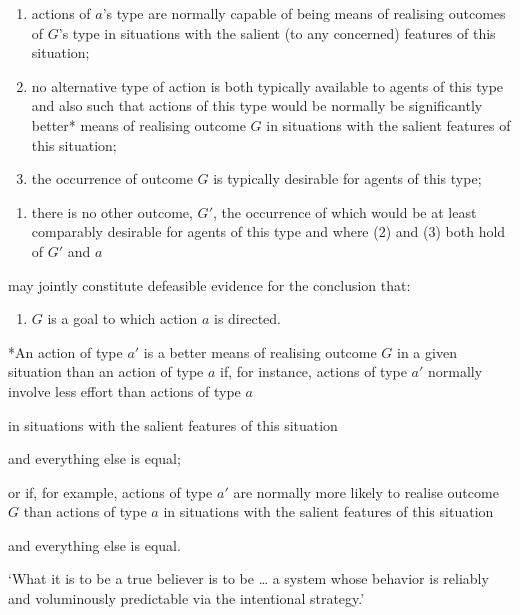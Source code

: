 \documentclass[12pt]{extarticle}
\begin{document}
\begin{multicols}{3}
\begin{enumerate}
\item actions of $a$'s type are normally capable of being means of realising outcomes of $G$'s type in situations with the salient (to any concerned) features of this situation;
 
\item no alternative type of action is both typically available to agents of this type and also such that actions of this type would be normally be significantly better* means of realising outcome $G$ in situations with the salient features of this situation;
 
\item the occurrence of outcome $G$ is typically desirable for agents of this type;
 
\end{enumerate}
 
\begin{enumerate}[resume]
 
\item there is no other outcome, $G'$, the occurrence of which would be at least comparably desirable for agents of this type and where (2) and (3) both hold of $G'$ and $a$
 
\end{enumerate}
 
may jointly constitute defeasible evidence for the conclusion that:
 
\begin{enumerate}[resume]
 
\item $G$ is a goal to which action $a$ is directed.
 
\end{enumerate}
 
{
 
\footnotesize
 
*An action of type $a'$ is a better means of realising outcome $G$ in a given situation than an action of type $a$ if, for instance, actions of type $a'$ normally involve less effort than actions of type $a$
 
in situations with the salient features of this situation
 
and everything else is equal;
 
or if, for example, actions of type $a'$ are normally more likely to realise outcome $G$ than actions of type $a$ in situations with the salient features of this situation
 
and everything else is equal.
 
}
 
‘What it is to be a true believer is to be … a system whose behavior is reliably and voluminously predictable via the intentional strategy.’
\citep[p.\ 15]{Dennett:1987sf}
 
 

 
\footnotesize 


\end{multicols}
\end{document}
